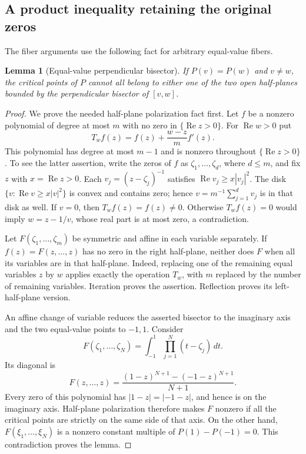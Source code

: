 \documentclass[11pt,reqno]{amsart}
\numberwithin{equation}{section}
\newtheorem{lemma}[theorem]{Lemma}
\theoremstyle{definition}
\theoremstyle{remark}
\renewcommand{\Re}{\operatorname{Re}}
\begin{document}
\subsection{A product inequality retaining the original zeros}

The fiber arguments use the following fact for arbitrary equal-value
fibers.

\begin{lemma}[Equal-value perpendicular bisector]\label{bc:equal-fiber}
If $P(v)=P(w)$ and $v\ne w$, the critical points of $P$ cannot all
belong to either one of the two open half-planes bounded by the
perpendicular bisector of $[v,w]$.
\end{lemma}

\begin{proof}
We prove the needed half-plane polarization fact first.  Let $f$ be a
nonzero polynomial of degree at most $m$ with no zero in
$\{\Re z>0\}$.  For $\Re w>0$ put
\[
 T_w f(z)=f(z)+\frac{w-z}{m}f'(z).
\]
This polynomial has degree at most $m-1$ and is nonzero throughout
$\{\Re z>0\}$.  To see the latter assertion, write the zeros of
$f$ as $\zeta_1,\ldots,\zeta_d$, where $d\leq m$, and fix
$z$ with $x=\Re z>0$.  Each $v_j=(z-\zeta_j)^{-1}$ satisfies
$\Re v_j\geq x|v_j|^2$.  The disk
$\{v:\Re v\geq x|v|^2\}$ is convex and contains zero; hence
$v=m^{-1}\sum_{j=1}^d v_j$ is in that disk as well.  If $v=0$,
then $T_w f(z)=f(z)\ne0$.  Otherwise $T_w f(z)=0$ would imply
$w=z-1/v$, whose real part is at most zero, a contradiction.

Let $F(\zeta_1,\ldots,\zeta_m)$ be symmetric and affine in each
variable separately.  If $f(z)=F(z,\ldots,z)$ has no zero in the
right half-plane, neither does $F$ when all its variables are in that
half-plane.  Indeed, replacing one of the remaining equal variables
$z$ by $w$ applies exactly the operation $T_w$, with $m$ replaced by
the number of remaining variables.  Iteration proves the assertion.
Reflection proves its left-half-plane version.

An affine change of variable reduces the asserted bisector to the
imaginary axis and the two equal-value points to $-1,1$.  Consider
\[
 F(\zeta_1,\ldots,\zeta_N)
   =\int_{-1}^{1}\prod_{j=1}^N(t-\zeta_j)\,dt.
\]
Its diagonal is
\[
 F(z,\ldots,z)=\frac{(1-z)^{N+1}-(-1-z)^{N+1}}{N+1}.
\]
Every zero of this polynomial has $|1-z|=|-1-z|$, and hence is on
the imaginary axis.  Half-plane polarization therefore makes $F$
nonzero if all the critical points are strictly on the same side of
that axis.  On the other hand, $F(\xi_1,\ldots,\xi_N)$ is a nonzero
constant multiple of $P(1)-P(-1)=0$.  This contradiction proves the
lemma.
\end{proof}
\end{document}

